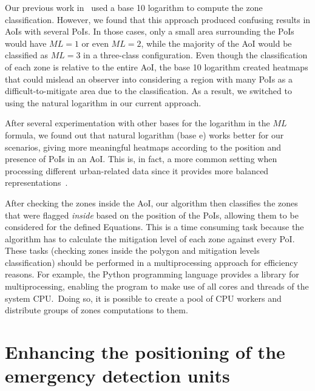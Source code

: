 \begin{refsection}
Our previous work in~\cite{riskzones} used a base 10 logarithm to compute the zone classification. However, we found that this approach produced confusing results in AoIs with several PoIs. In those cases, only a small area surrounding the PoIs would have $ML=1$ or even $ML=2$, while the majority of the AoI would be classified as $ML=3$ in a three-class configuration. Even though the classification of each zone is relative to the entire AoI, the base 10 logarithm created heatmaps that could mislead an observer into considering a region with many PoIs as a difficult-to-mitigate area due to the classification. As a result, we switched to using the natural logarithm in our current approach.

After several experimentation with other bases for the logarithm in the $ML$ formula, we found out that natural logarithm (base $\mathrm{e}$) works better for our scenarios, giving more meaningful heatmaps according to the position and presence of PoIs in an AoI. This is, in fact, a more common setting when processing different urban-related data since it provides more balanced representations~\cite{log1,log2}. 

After checking the zones inside the AoI, our algorithm then classifies the zones that were flagged \emph{inside} based on the position of the PoIs, allowing them to be considered for the defined Equations. This is a time consuming task because the algorithm has to calculate the mitigation level of each zone against every PoI. These tasks (checking zones inside the polygon and mitigation levels classification) should be performed in a multiprocessing approach for efficiency reasons. For example, the Python programming language provides a library for multiprocessing, enabling the program to make use of all cores and threads of the system CPU.\ Doing so, it is possible to create a pool of CPU workers and distribute groups of zones computations to them. %

\section{Enhancing the positioning of the emergency detection units}\label{sec:positioning}



\end{refsection}
